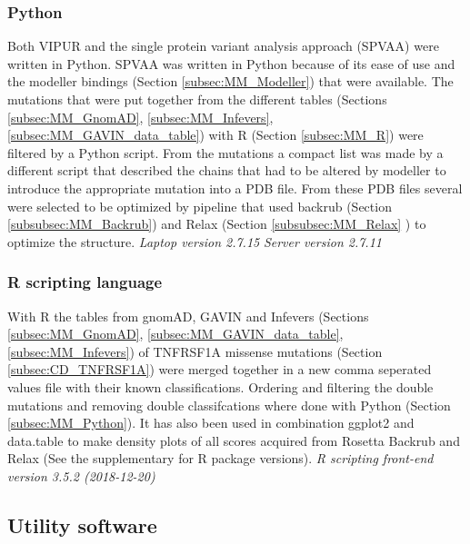 \subsubsection{Python}
Both VIPUR and the single protein variant analysis approach (SPVAA) were written in Python. SPVAA was written in Python because of its ease of use and the modeller bindings (Section \ref{subsec:MM_Modeller}) that were available. 
The mutations that were put together from the different tables (Sections \ref{subsec:MM_GnomAD}, \ref{subsec:MM_Infevers}, \ref{subsec:MM_GAVIN_data_table}) with R (Section \ref{subsec:MM_R}) were filtered by a Python script. 
From the mutations a compact list was made by a different script that described the chains that had to be altered by modeller to introduce the appropriate mutation into a PDB file. From these PDB files several were selected to be optimized by pipeline that used backrub (Section \ref{subsubsec:MM_Backrub}) and Relax (Section \ref{subsubsec:MM_Relax} ) to optimize the structure.
\label{subsec:MM_Python}
\newline
\textit{Laptop version 2.7.15}
\newline
\textit{Server version 2.7.11}

\subsubsection{R scripting language}
With R the tables from gnomAD, GAVIN and Infevers (Sections \ref{subsec:MM_GnomAD}, \ref{subsec:MM_GAVIN_data_table}, \ref{subsec:MM_Infevers}) of TNFRSF1A missense mutations (Section \ref{subsec:CD_TNFRSF1A}) were merged together in a new comma seperated values file with their known classifications. Ordering and filtering the double mutations and removing double classifcations where done with Python (Section \ref{subsec:MM_Python}). It has also been used in combination ggplot2 \cite{wickham_create_nodate} and data.table \cite{dowle_rs_2019} to make density plots of all scores acquired from Rosetta Backrub and Relax (See the supplementary for R package versions).
\label{subsec:MM_R}
\newline
\noindent
\textit{R scripting front-end version 3.5.2 (2018-12-20)}

\subsection{Utility software}

